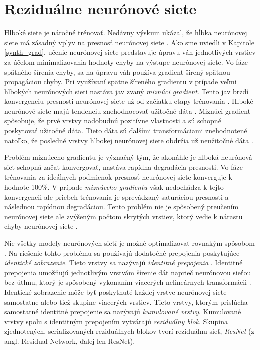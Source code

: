 \chapter{Reziduálne neurónové siete}

\label{ResNet_kap2}

Hlboké siete je náročné trénovať. Nedávny výskum ukázal, že hĺbka neurónovej siete má zásadný vplyv na presnosť neurónovej siete \cite{Wu2017, He2016, Targ2016}. Ako sme uviedli v Kapitole \ref{synth_grad}, učenie neurónovej siete predstavuje úpravu váh jednotlivých vrstiev za účelom minimalizovania hodnoty chyby na výstupe neurónovej siete. Vo fáze spätného šírenia chyby, sa na úpravu váh používa gradient šírený spätnou propagáciou chyby. Pri využívaní spätne šíreného gradientu v prípade veľmi hlbokých neurónových sieti nastáva jav zvaný \textit{miznúci gradient}.
Tento jav brzdí konvergenciu presnosti neurónovej siete už od začiatku etapy trénovania \cite{Wu2017}. Hlboké neurónové siete majú tendenciu znehodnocovať užitočné dáta \cite{Targ2016}. Miznúci gradient spôsobuje, že prvé vrstvy nadobudnú pozitívne vlastnosti a sú schopné poskytovať užitočné dáta. Tieto dáta sú ďalšími transformáciami znehodnotené natoľko, že posledné vrstvy hlbokej neurónovej siete obdržia už neužitočné dáta \cite{Wu2017}.

Problém miznúceho gradientu je význačný tým, že akonáhle je hlboká neurónová sieť schopná začať konvergovať, nastáva rapídna degradácia presnosti. Vo fáze trénovania za ideálnych podmienok presnosť neurónovej siete konverguje k hodnote 100\%. V prípade \textit{miznúceho gradientu} však nedochádza k tejto konvergencii ale priebeh trénovania je sprevádzaný saturáciou presnosti a následnou rapídnou degradáciou. Tento problém nie je spôsobený preučením neurónovej siete ale zvýšeným počtom skrytých vrstiev, ktorý vedie k nárastu chyby neurónovej siete \cite{Wu2017}. 

Nie všetky modely neurónových sietí je možné optimalizovať rovnakým spôsobom \cite{Wu2017}. Na riešenie tohto problému sa používajú dodatočné prepojenia poskytujúce \textit{identické zobrazenie}. Tieto vrstvy sa nazývajú \textit{identitné prepojenia} \cite{Wu2017, Targ2016}. Identitné prepojenia umožňujú jednotlivým vrstvám šírenie dát naprieč neurónovou sieťou bez útlmu, ktorý je spôsobený vykonaním viacerých nelineárnych transformácii \cite{Targ2016}. Identické zobrazenie môže byť poskytnuté každej vrstve neurónovej siete samostatne alebo tiež skupine viacerých vrstiev. Tieto vrstvy, ktorým prislúcha samostatné identitné prepojenie sa nazývajú \textit{kumulované vrstvy}. Kumulované vrstvy spolu s identitným prepojením vytvárajú \textit{reziduálny blok}. Skupina zjednotených, serializovaných reziduálnych blokov tvorí reziduálnu sieť, \textit{ResNet} (z angl. Residual Network, ďalej len ResNet).

